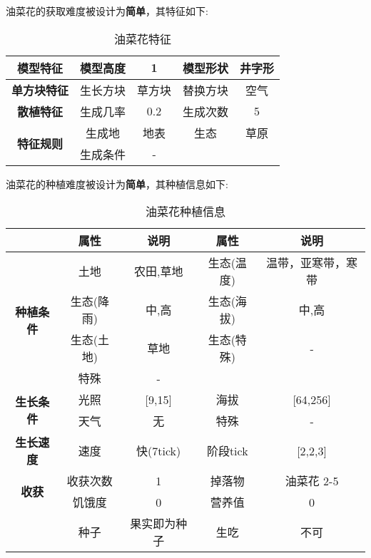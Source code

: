油菜花的获取难度被设计为\textbf{简单}，其特征如下:
\begin{table}[H]
    \centering
    \caption{油菜花特征}
    \label{table:油菜花特征}
    \setlength{\tabcolsep}{4mm}
    \begin{tabular}{c|cc|cc}
        \toprule
        \textbf{模型特征}                  & 模型高度 & 1      & 模型形状 & 井字形 \\
        \midrule
        \textbf{单方块特征}                & 生长方块 & 草方块 & 替换方块 & 空气   \\
        \midrule
        \textbf{散植特征}                  & 生成几率 & 0.2    & 生成次数 & 5      \\
        \midrule
        \multirow{2}{*}{\textbf{特征规则}} & 生成地   & 地表   & 生态     & 草原   \\
                                           & 生成条件 & -                       \\
        \bottomrule
    \end{tabular}
\end{table}


油菜花的种植难度被设计为\textbf{简单}，其种植信息如下:

\begin{table}[H]
    \centering
    \caption{油菜花种植信息}
    \label{table:油菜花种植信息}
    \setlength{\tabcolsep}{4mm}
    \begin{tabular}{c|cc|cc}
        \toprule
                                           & \textbf{属性} & \textbf{说明} & \textbf{属性} & \textbf{说明} \\
        \midrule
        \multirow{4}{*}{\textbf{种植条件}} & 土地          & 农田,草地          & 生态(温度)    & 温带，亚寒带，寒带  \\
                                           & 生态(降雨)    & 中,高            & 生态(海拔)    & 中,高            \\
                                           & 生态(土地)    & 草地          & 生态(特殊)    & -             \\
                                           & 特殊          & -                                             \\
        \midrule
        \multirow{2}{*}{\textbf{生长条件}} & 光照          & [9,15]        & 海拔          & [64,256]      \\
                                           & 天气          & 无            & 特殊          & -             \\
        \midrule
        \textbf{生长速度}                  & 速度          & 快(7tick)     & 阶段tick      & [2,2,3]       \\
        \midrule
        \multirow{2}{*}{\textbf{收获}}     & 收获次数      & 1             & 掉落物        & 油菜花 2-5      \\
                                           & 饥饿度        & 0             & 营养值        & 0             \\
                                           & 种子          & 果实即为种子  & 生吃          & 不可   \\
        \bottomrule
    \end{tabular}
\end{table}

